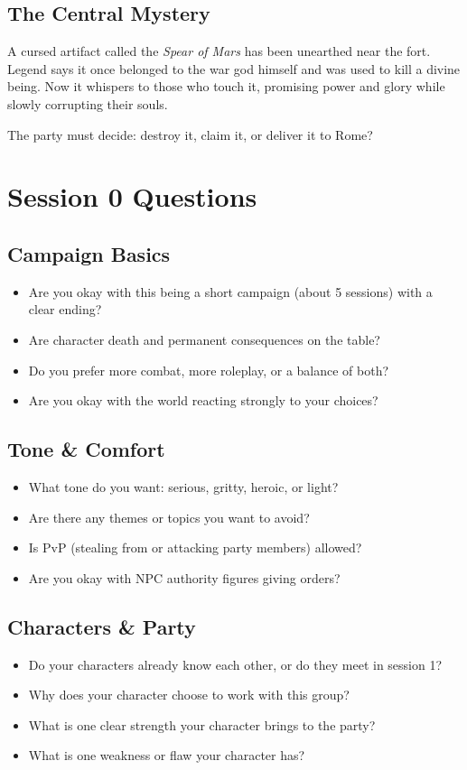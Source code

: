 \documentclass[letterpaper,oneside,twocolumn,openany]{dndbook}
\begin{document}
\section{The Central Mystery}

A cursed artifact called the \textit{Spear of Mars} has been unearthed near the fort. Legend says it once belonged to the war god himself and was used to kill a divine being. Now it whispers to those who touch it, promising power and glory while slowly corrupting their souls.

The party must decide: destroy it, claim it, or deliver it to Rome?

\chapter{Session 0 Questions}

\section{Campaign Basics}
\begin{itemize}
\item Are you okay with this being a short campaign (about 5 sessions) with a clear ending?
\item Are character death and permanent consequences on the table?
\item Do you prefer more combat, more roleplay, or a balance of both?
\item Are you okay with the world reacting strongly to your choices?
\end{itemize}

\section{Tone \& Comfort}
\begin{itemize}
\item What tone do you want: serious, gritty, heroic, or light?
\item Are there any themes or topics you want to avoid?
\item Is PvP (stealing from or attacking party members) allowed?
\item Are you okay with NPC authority figures giving orders?
\end{itemize}

\section{Characters \& Party}
\begin{itemize}
\item Do your characters already know each other, or do they meet in session 1?
\item Why does your character choose to work with this group?
\item What is one clear strength your character brings to the party?
\item What is one weakness or flaw your character has?
\end{itemize}
\end{document}
